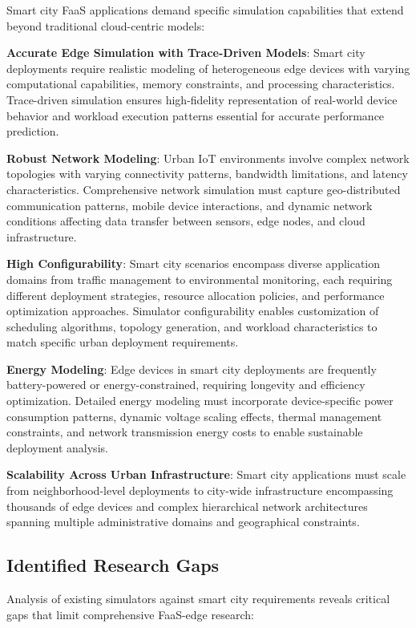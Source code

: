 Smart city FaaS applications demand specific simulation capabilities that extend beyond traditional cloud-centric models:

\textbf{Accurate Edge Simulation with Trace-Driven Models}: Smart city deployments require realistic modeling of heterogeneous edge devices with varying computational capabilities, memory constraints, and processing characteristics. Trace-driven simulation ensures high-fidelity representation of real-world device behavior and workload execution patterns essential for accurate performance prediction.

\textbf{Robust Network Modeling}: Urban IoT environments involve complex network topologies with varying connectivity patterns, bandwidth limitations, and latency characteristics. Comprehensive network simulation must capture geo-distributed communication patterns, mobile device interactions, and dynamic network conditions affecting data transfer between sensors, edge nodes, and cloud infrastructure.

\textbf{High Configurability}: Smart city scenarios encompass diverse application domains from traffic management to environmental monitoring, each requiring different deployment strategies, resource allocation policies, and performance optimization approaches. Simulator configurability enables customization of scheduling algorithms, topology generation, and workload characteristics to match specific urban deployment requirements.

\textbf{Energy Modeling}: Edge devices in smart city deployments are frequently battery-powered or energy-constrained, requiring longevity and efficiency optimization. Detailed energy modeling must incorporate device-specific power consumption patterns, dynamic voltage scaling effects, thermal management constraints, and network transmission energy costs to enable sustainable deployment analysis.

\textbf{Scalability Across Urban Infrastructure}: Smart city applications must scale from neighborhood-level deployments to city-wide infrastructure encompassing thousands of edge devices and complex hierarchical network architectures spanning multiple administrative domains and geographical constraints.

\subsection{Identified Research Gaps}

Analysis of existing simulators against smart city requirements reveals critical gaps that limit comprehensive FaaS-edge research:


